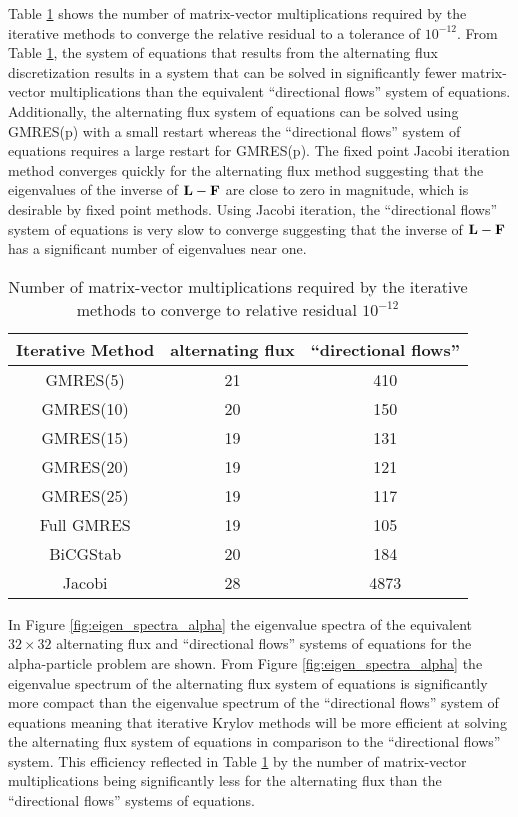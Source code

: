 Table \ref{tab:alpha_particle} shows the number of matrix-vector multiplications required by the iterative methods to converge the relative residual to a tolerance of $10^{-12}$. From Table \ref{tab:alpha_particle}, the system of equations that results from the alternating flux \dG discretization results in a system that can be solved in significantly fewer matrix-vector multiplications than the equivalent ``directional flows'' system of equations. Additionally, the alternating flux system of equations can be solved using GMRES(p) with a small restart whereas the ``directional flows'' system of equations requires a large restart for GMRES(p). The fixed point Jacobi iteration method converges quickly for the alternating flux method suggesting that the eigenvalues of the inverse of $\mathbf{L} - \mathbf{F}$ are close to zero in magnitude, which is desirable by fixed point methods. Using Jacobi iteration, the ``directional flows'' system of equations is very slow to converge suggesting that the inverse of $\mathbf{L} - \mathbf{F}$ has a significant number of eigenvalues near one.

\begin{table}[!htb]
  \centering
  \caption{Number of matrix-vector multiplications required by the iterative methods to converge to relative residual $10^{-12}$}
  \begin{tabular}{c|c|c}
    \toprule
    Iterative Method     & alternating flux & ``directional flows'' \\
    \midrule
    GMRES(5)   & 21               & 410               \\
    GMRES(10)  & 20               & 150               \\
    GMRES(15)  & 19               & 131               \\
    GMRES(20)  & 19               & 121               \\
    GMRES(25)  & 19               & 117               \\
    Full GMRES & 19               & 105               \\
    BiCGStab   & 20               & 184               \\
    Jacobi     & 28               & 4873              \\
    \bottomrule
  \end{tabular}
  \label{tab:alpha_particle}
\end{table}

In Figure \ref{fig:eigen_spectra_alpha} the eigenvalue spectra of the equivalent $32 \times 32$  alternating flux and ``directional flows'' systems of equations for the alpha-particle problem are shown. From Figure \ref{fig:eigen_spectra_alpha} the eigenvalue spectrum of the alternating flux system of equations is significantly more compact than the eigenvalue spectrum of the ``directional flows'' system of equations meaning that iterative Krylov methods will be more efficient at solving the alternating flux system of equations in comparison to the ``directional flows'' system. This efficiency reflected in Table \ref{tab:alpha_particle} by the number of matrix-vector multiplications being significantly less for the alternating flux than the ``directional flows'' systems of equations.

